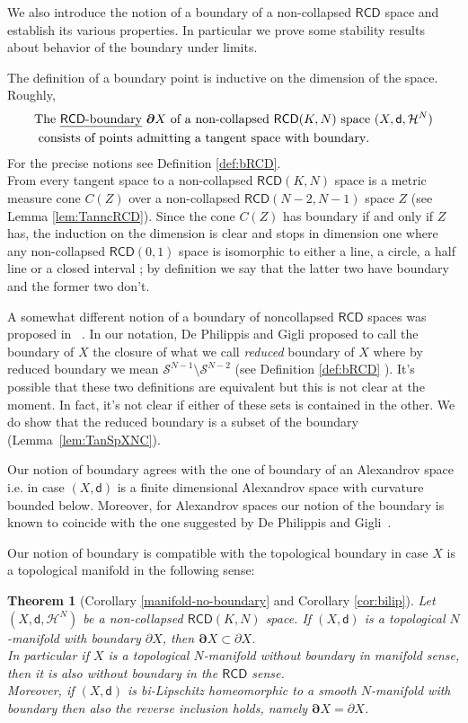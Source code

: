 \documentclass[a4paper]{amsart}
\theoremstyle{plain}
\newtheorem{theorem}[lemma]{Theorem}
\theoremstyle{definition}
\numberwithin{equation}{section}
\renewcommand{\S}{\mathcal{S}}
\newcommand{\RCD}{\mathsf{RCD}}
\newcommand{\sfd}{\mathsf d}
\newcommand{\cH}{\mathcal{H}}
\newcommand{\bRCD}{\boldsymbol\partial}
\begin{document}
We also introduce the notion of a boundary of a non-collapsed $\RCD$ space and establish its various properties. In particular we prove some stability results about behavior of the boundary under limits.

{
The definition of a boundary point is inductive on the dimension of the space. Roughly, 
\begin{align*}
&\text{The \emph{$\RCD$-boundary} $\bRCD X$ of a non-collapsed $\RCD(K,N)$ space $(X,\sfd, \cH^{N})$}\\
&\text{ consists of points admitting a tangent space with boundary}.
\end{align*}
For the precise notions see Definition \ref{def:bRCD}.
\\  From \cite{Kitab-noncol, GDPNonColl} every tangent space to a non-collapsed $\RCD(K,N)$ space is a metric measure cone $C(Z)$ over a non-collapsed $\RCD(N-2,N-1)$ space $Z$ (see Lemma \ref{lem:TanncRCD}). Since the cone $C(Z)$ has boundary if and only if $Z$ has, the induction on the dimension is clear and stops in dimension one where any non-collapsed $\RCD(0,1)$ space is isomorphic to either a line, a circle, a half line or a closed interval  \cite{KL}; by definition we say that the latter two have boundary and the former two don't.

 A somewhat different notion of a boundary of noncollapsed $\RCD$ spaces was proposed in ~\cite{GDPNonColl}. In our notation,   De Philippis and Gigli proposed to call the boundary of $X$ the closure of what we call \emph{reduced} boundary of $X$ where by reduced boundary we mean  $\S^{N-1}\setminus \S^{N-2}$ (see Definition \ref{def:bRCD} ). It's possible that these two definitions are equivalent but this is not clear at the moment. In fact, it's not clear if either of these sets is contained in the other. We do show that the reduced boundary is a subset of the boundary (Lemma~\ref{lem:TanSpXNC}).


 Our notion of boundary agrees with the one of boundary of an Alexandrov space i.e. in case $(X,\sfd)$ is a finite dimensional Alexandrov space with curvature bounded below.  Moreover, for Alexandrov spaces our notion of the boundary is known to coincide with the one suggested by De Philippis and Gigli~\cite{Per-stab}.   
 
 Our notion of boundary is compatible with the  topological boundary in case $X$ is a topological manifold in the following sense:

\begin{theorem}[Corollary \ref{manifold-no-boundary} { and Corollary \ref{cor:bilip}}] \label{manifold-no-boundaryIntro}
Let $(X,\sfd, \cH^{N})$ be a non-collapsed $\RCD(K,N)$ space.  If $(X,\sfd)$ is a  topological $N$-manifold with boundary $\partial X$, then  $\boldsymbol\partial X \subset \partial X$.\\In particular if   $X$ is a topological $N$-manifold without boundary in manifold sense, then it is also without boundary in the $\RCD$ sense.
\\  Moreover, if $(X,\sfd)$ is bi-Lipschitz homeomorphic to a smooth $N$-manifold with boundary  then also the reverse inclusion holds, namely  $\boldsymbol\partial X = \partial X$.
\end{theorem}

}
\end{document}
